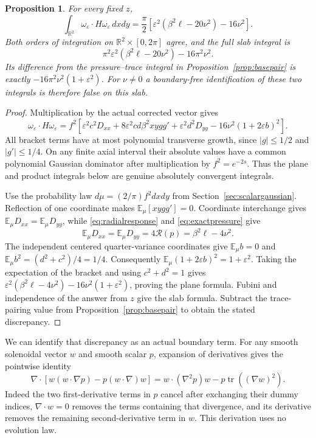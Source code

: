 \documentclass[11pt]{article}
\newtheorem{proposition}[theorem]{Proposition}
\newcommand{\R}{\mathbb R}\newcommand{\tr}{\operatorname{tr}}
\begin{document}
\begin{proposition}\label{prop:fullrepaired}
For every fixed $z$,
\[
 \int_{\R^2}\omega_\varepsilon\cdot H\omega_\varepsilon\,dxdy
 =\frac\pi2\left[\varepsilon^2(\beta^2\ell-20\nu^2)-16\nu^2\right].
\]
Both orders of integration on $\R^2\times[0,2\pi]$ agree, and
the full slab integral is
\[
 \pi^2\varepsilon^2(\beta^2\ell-20\nu^2)-16\pi^2\nu^2.
\]
Its difference from the pressure--trace integral in
Proposition~\ref{prop:basepair} is exactly
$-16\pi^2\nu^2(1+\varepsilon^2)$. For $\nu\ne0$ a boundary-free
identification of these two integrals is therefore false on this slab.
\end{proposition}
\begin{proof}
Multiplication by the actual corrected vector gives
\[
 \omega_\varepsilon\cdot H\omega_\varepsilon
 =f^2\left[\varepsilon^2c^2D_{xx}
 +8\varepsilon^2cd\beta^2xygg'
 +\varepsilon^2d^2D_{yy}
 -16\nu^2(1+2\varepsilon b)^2\right].
\]
All bracket terms have at most polynomial transverse growth, since
$|g|\leq1/2$ and $|g'|\leq1/4$. On any finite axial interval
their absolute values have a common polynomial Gaussian dominator
after multiplication by $f^2=e^{-2s}$. Thus the plane and product
integrals below are genuine absolutely convergent integrals.

Use the probability law $d\mu=(2/\pi)f^2dxdy$ from Section~\ref{sec:scalargaussian}.
Reflection of one coordinate makes $\mathbb E_\mu[xygg']=0$.
Coordinate interchange gives $\mathbb E_\mu D_{xx}
=\mathbb E_\mu D_{yy}$, while \eqref{eq:radialresponse} and
\eqref{eq:exactpressure} give
\[
 \mathbb E_\mu D_{xx}=\mathbb E_\mu D_{yy}
 =4\mathcal R(p)=\beta^2\ell-4\nu^2.
\]
The independent centered quarter-variance coordinates give
$\mathbb E_\mu b=0$ and
$\mathbb E_\mu b^2=(d^2+c^2)/4=1/4$.
Consequently $\mathbb E_\mu(1+2\varepsilon b)^2=1+\varepsilon^2$.
Taking the expectation of the bracket and using $c^2+d^2=1$
gives $\varepsilon^2(\beta^2\ell-4\nu^2)
-16\nu^2(1+\varepsilon^2)$, proving the plane formula.
Fubini and independence of the answer from $z$ give the slab formula.
Subtract the trace-pairing value from
Proposition~\ref{prop:basepair} to obtain the stated discrepancy.
\end{proof}

We can identify that discrepancy as an actual boundary term.
For any smooth solenoidal vector $w$ and smooth scalar $p$, expansion
of derivatives gives the pointwise identity
\begin{equation}\label{eq:slabdivergence}
 \nabla\cdot\left[w(w\cdot\nabla p)-p(w\cdot\nabla)w\right]
 =w\cdot(\nabla^2p)w-p\operatorname{tr}((\nabla w)^2).
\end{equation}
Indeed the two first-derivative terms in $p$ cancel after exchanging
their dummy indices, $\nabla\cdot w=0$ removes the terms containing
that divergence, and its derivative removes the remaining
second-derivative term in $w$. This derivation uses no evolution law.
\end{document}
